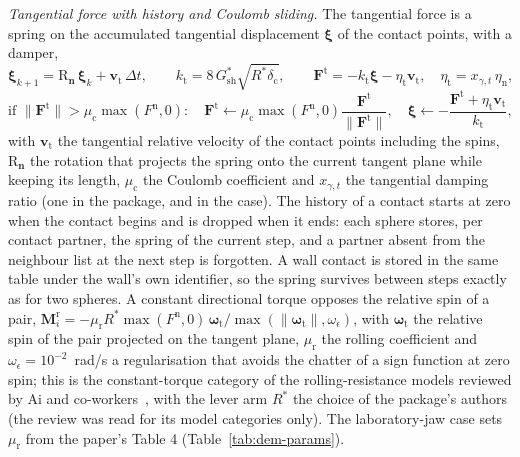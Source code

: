 \emph{Tangential force with history and Coulomb sliding.} The tangential force is a spring on the accumulated tangential displacement $\boldsymbol\xi$ of the
contact points, with a damper,
\begin{equation}
\boldsymbol\xi_{k+1} = \mathrm R_{\mathbf n}\,\boldsymbol\xi_k + \mathbf v_{\mathrm t}\,\Delta t,\qquad
k_{\mathrm t}=8\,G^{\ast}_{\mathrm{sh}}\sqrt{R^{\ast}\delta_{\mathrm c}},\qquad
\mathbf F^{\mathrm t}=-k_{\mathrm t}\boldsymbol\xi-\eta_{\mathrm t}\mathbf v_{\mathrm t},\quad \eta_{\mathrm t}=x_{\gamma,t}\,\eta_{\mathrm n},
\label{eq:dem-tangent}
\end{equation}
\begin{equation}
\text{if }\lVert\mathbf F^{\mathrm t}\rVert>\mu_{\mathrm c}\max(F^{\mathrm n},0):\quad
\mathbf F^{\mathrm t}\leftarrow\mu_{\mathrm c}\max(F^{\mathrm n},0)\frac{\mathbf F^{\mathrm t}}{\lVert\mathbf F^{\mathrm t}\rVert},\quad
\boldsymbol\xi\leftarrow-\frac{\mathbf F^{\mathrm t}+\eta_{\mathrm t}\mathbf v_{\mathrm t}}{k_{\mathrm t}} ,
\label{eq:dem-coulomb}
\end{equation}
with $\mathbf v_{\mathrm t}$ the tangential relative velocity of the contact points including the spins, $\mathrm R_{\mathbf n}$ the rotation that projects the spring onto the
current tangent plane while keeping its length, $\mu_{\mathrm c}$ the Coulomb coefficient and $x_{\gamma,t}$ the tangential damping ratio (one in the package, and in
the case). The history of a contact starts at zero when the contact begins and is dropped when it ends: each sphere stores, per contact partner, the spring
of the current step, and a partner absent from the neighbour list at the next step is forgotten. A wall contact is stored in the same table under the
wall's own identifier, so the spring survives between steps exactly as for two spheres. A constant directional torque opposes the relative spin of
a pair, $\mathbf M^{\mathrm r}_i=-\mu_{\mathrm r}R^{\ast}\max(F^{\mathrm n},0)\,\boldsymbol\omega_{\mathrm t}/\max(\lVert\boldsymbol\omega_{\mathrm t}\rVert,\omega_\epsilon)$, with $\boldsymbol\omega_{\mathrm t}$ the
relative spin of the pair projected on the tangent plane, $\mu_{\mathrm r}$ the rolling coefficient and $\omega_\epsilon=10^{-2}$~rad/s a regularisation that avoids the chatter of a sign
function at zero spin; this is the constant-torque category of the rolling-resistance models reviewed by Ai and co-workers~\cite{ai2011}, with the lever arm $R^{\ast}$ the choice of the package's
authors (the review was read for its model categories only). The laboratory-jaw case sets $\mu_{\mathrm r}$ from the paper's Table 4 (Table~\ref{tab:dem-params}).

